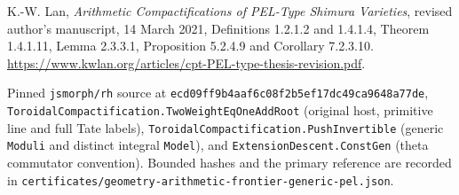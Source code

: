 K.-W. Lan, \emph{Arithmetic Compactifications of PEL-Type Shimura
Varieties}, revised author's manuscript, 14 March 2021,
Definitions 1.2.1.2 and 1.4.1.4, Theorem 1.4.1.11,
Lemma 2.3.3.1, Proposition 5.2.4.9 and Corollary 7.2.3.10.
\url{https://www.kwlan.org/articles/cpt-PEL-type-thesis-revision.pdf}.

Pinned \texttt{jsmorph/rh} source at
\texttt{ecd09ff9b4aaf6c08f2b5ef17dc49ca9648a77de},
\texttt{ToroidalCompactification.TwoWeightEqOneAddRoot} (original
host, primitive line and full Tate labels),
\texttt{ToroidalCompactification.PushInvertible} (generic
\texttt{Moduli} and distinct integral \texttt{Model}), and
\texttt{ExtensionDescent.ConstGen} (theta commutator convention).
Bounded hashes and the primary reference are recorded in
\texttt{certificates/geometry-arithmetic-frontier-generic-pel.json}.
